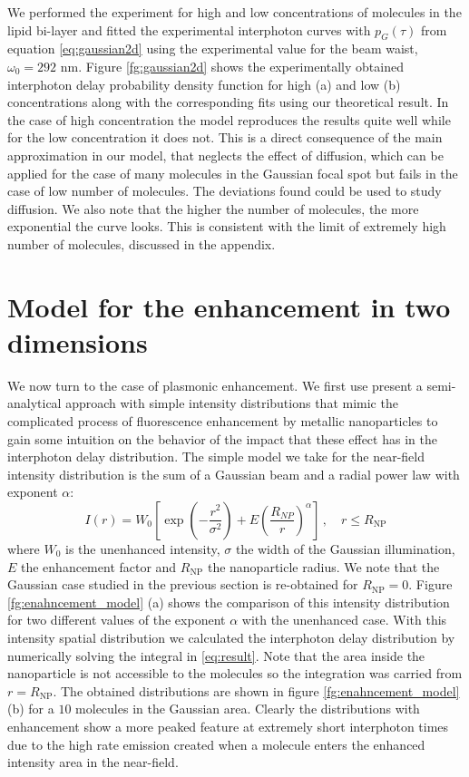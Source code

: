 We performed the experiment for high and low concentrations 
of molecules in the lipid bi-layer and fitted 
the experimental interphoton curves with $p_{G}(\tau)$ from 
equation \ref{eq:gaussian2d} using the experimental value 
for the beam waist, $\omega_0=292$ nm. 
Figure \ref{fg:gaussian2d} shows the experimentally obtained interphoton 
delay probability density function for high (a) and low (b) concentrations 
along with the corresponding fits using our theoretical result. 
In the case of high concentration the model reproduces the results quite 
well while for the low concentration it does not. This is a direct 
consequence of the main approximation in our model, that neglects the 
effect of diffusion, which can be applied for the case of many molecules 
in the Gaussian focal spot but fails in the case of low number of molecules. 
The deviations found could be used to study diffusion. We also note that 
the higher the number of molecules, the more exponential
the curve looks. This is consistent with the limit of extremely high 
number of molecules, discussed in the appendix. 

\section{Model for the enhancement in two dimensions}

We now turn to the case of plasmonic enhancement. We first use present 
a semi-analytical approach with simple 
intensity distributions that mimic the complicated process of fluorescence 
enhancement by metallic nanoparticles to 
gain some intuition on the behavior of the impact that these effect has in 
the interphoton delay distribution.
The simple model we take for the near-field intensity distribution is the 
sum of a Gaussian beam
and a radial power law with exponent $\alpha$: 
\begin{equation}
I(r) = W_0 \left[ \exp \left(-\frac{r^2}{\sigma^2} \right) + E \left(\frac{R_{NP}}{r}\right)^\alpha  \right]\,, 
\quad r \leq R_\textrm{NP}
\label{eq:enhancement_model}
\end{equation}
where $W_0$ is the unenhanced intensity, $\sigma$ the width of the Gaussian 
illumination, $E$ the enhancement
factor and $R_\textrm{NP}$ the nanoparticle radius. 
We note that the Gaussian case studied in the previous section is re-obtained for $R_\textrm{NP}=0$. Figure
\ref{fg:enahncement_model} (a) shows the comparison of this intensity distribution for two different values 
of the exponent $\alpha$ with the unenhanced case. 
With this intensity spatial distribution we calculated the interphoton delay distribution by numerically 
solving the integral in \ref{eq:result}. Note that the area inside the nanoparticle is not accessible
to the molecules so the integration was carried from $r=R_\textrm{NP}$.
The obtained distributions are shown in figure \ref{fg:enahncement_model} (b) 
for a $10$ molecules in the Gaussian area.  Clearly the distributions with enhancement show a more peaked feature at
extremely short interphoton times due to the high rate emission created when a molecule enters the 
enhanced intensity area in the near-field. 

